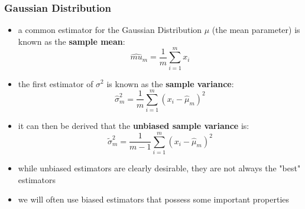 \documentclass[11pt, twocolumn]{report}
\begin{document}
\subsubsection{Gaussian Distribution}
\begin{itemize}
  \item a common estimator for the Gaussian Distribution $\mu$ (the mean
    parameter) is known as the \textbf{sample mean}:
    \begin{equation}
      \hat{mu}_m = \frac{1}{m} \sum_{i=1}^m x_i
    \end{equation}
  \item the first estimator of $\sigma^2$ is known as the \textbf{sample
      variance}:
    \begin{equation}
      \hat{\sigma}_m^2 = \frac{1}{m} \sum_{i=1}^m \left(x_i -
        \hat{\mu}_m\right)^2
    \end{equation}
  \item it can then be derived that the \textbf{unbiased sample variance} is:
    \begin{equation}
      \tilde{\sigma}_m^2 = \frac{1}{m-1} \sum_{i=1}^m \left(x_i -
        \hat{\mu}_m\right)^2
    \end{equation}
  \item while unbiased estimators are clearly desirable, they are not always
    the "best" estimators
  \item we will often use biased estimators that possess some important
    properties
\end{itemize}
\end{document}
